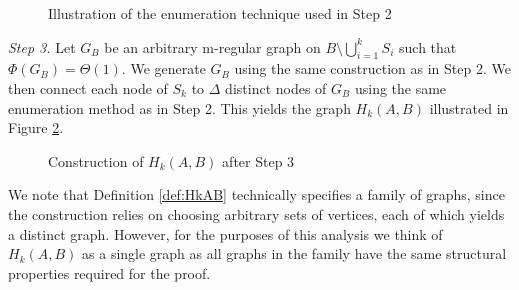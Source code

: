 \begin{definition}
    \begin{figure}[h]
        \centering
        
        \caption{Illustration of the enumeration technique used in Step 2}
        \label{fig:HkAB_2}
    \end{figure}


	\textit{Step 3.} Let $G_B$ be an arbitrary m-regular graph on $B \setminus \bigcup_{i=1}^k S_i$ such that $\Phi(G_B) = \Theta(1)$. 
	We generate $G_B$ using the same construction as in Step 2. We then connect each node of $S_k$ to $\Delta$ distinct nodes of $G_B$ using the same enumeration method as in Step 2. This yields the graph $H_k(A,B)$ illustrated in Figure \ref{fig:HkAB_3}.

    \begin{figure}[h]
        \centering
        
        \caption{Construction of $H_k(A,B)$ after Step 3}
        \label{fig:HkAB_3}
    \end{figure}


\end{definition}

We note that Definition \ref{def:HkAB} technically specifies a family of graphs, since the construction relies on choosing arbitrary sets of vertices, each of which yields a distinct graph. However, for the purposes of this analysis we think of $H_k(A,B)$ as a single graph as all graphs in the family have the same structural properties required for the proof. %

